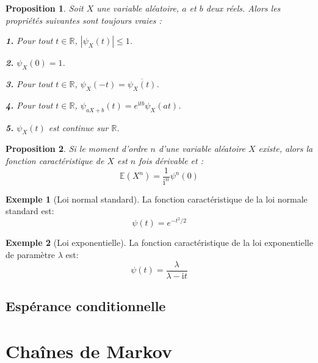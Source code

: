 \documentclass[
]{book}
\newtheorem{proposition}{Proposition}[chapter]
\theoremstyle{definition}
\theoremstyle{definition}
\newtheorem{example}{Exemple}[chapter]
\theoremstyle{definition}
\theoremstyle{remark}
\begin{document}
\begin{proposition}
\protect\hypertarget{prp:unnamed-chunk-17}{}{\label{prp:unnamed-chunk-17} }Soit \(X\) une variable aléatoire, \(a\) et \(b\) deux réels.
Alors les propriétés suivantes sont toujours vraies :

\textbf{1.} Pour tout \(t \in \mathbb{R}\), \(\left|\psi_X(t)\right| \leq 1\).

\textbf{2.} \(\psi_X(0)=1\).

\textbf{3.} Pour tout \(t \in \mathbb{R}\), \(\psi_X(−t) = \overline{\psi_X(t)}\).

\textbf{4.} Pour tout \(t \in \mathbb{R}\), \(\psi_{aX+b}(t) = e^{\mathrm{i}tb} \psi_X(at)\).

\textbf{5.} \(\psi_X(t)\) est continue sur \(\mathbb{R}\).
\end{proposition}

\begin{proposition}
\protect\hypertarget{prp:unnamed-chunk-18}{}{\label{prp:unnamed-chunk-18} }Si le moment d'ordre \(n\) d'une variable aléatoire \(X\) existe, alors la fonction caractéristique de
\(X\) est \(n\) fois dérivable et :
\[
  \mathbb{E}\left({X}^n \right)=\dfrac{1}{{\mathrm{i}}^n}{\psi}^n(0)
  \]
\end{proposition}

\begin{example}[Loi normal standard]
\protect\hypertarget{exm:unnamed-chunk-19}{}{\label{exm:unnamed-chunk-19} {} }La fonction caractéristique de la loi normale standard est: \[\psi(t)={e}^{-t^2/2}\]
\end{example}

\begin{example}[Loi exponentielle]
\protect\hypertarget{exm:unnamed-chunk-20}{}{\label{exm:unnamed-chunk-20} {} }La fonction caractéristique de la loi exponentielle de paramètre \(\lambda\) est:
\[
  \psi(t)=\dfrac{\lambda}{\lambda-\mathrm{i}t}
  \]
\end{example}

\hypertarget{espuxe9rance-conditionnelle}{%
\section{Espérance conditionnelle}\label{espuxe9rance-conditionnelle}}

\hypertarget{chauxeenes-de-markov}{%
\chapter{Chaînes de Markov}\label{chauxeenes-de-markov}}
\end{document}
